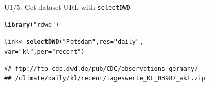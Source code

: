 \documentclass[compress, xcolor=dvipsnames]{beamer}\usepackage[]{graphicx}\usepackage[]{color}
\makeatletter
\newcommand{\hlstr}[1]{\textcolor[rgb]{0.192,0.494,0.8}{#1}}%
\newcommand{\hlstd}[1]{\textcolor[rgb]{0.345,0.345,0.345}{#1}}%
\newcommand{\hlkwb}[1]{\textcolor[rgb]{0.69,0.353,0.396}{#1}}%
\newcommand{\hlkwc}[1]{\textcolor[rgb]{0.333,0.667,0.333}{#1}}%
\newcommand{\hlkwd}[1]{\textcolor[rgb]{0.737,0.353,0.396}{\textbf{#1}}}%
\newenvironment{kframe}{%
 \def\at@end@of@kframe{}%
 \ifinner\ifhmode%
  \def\at@end@of@kframe{\end{minipage}}%
  \begin{minipage}{\columnwidth}%
 \fi\fi%
 \def\FrameCommand##1{\hskip\@totalleftmargin \hskip-\fboxsep
 \colorbox{shadecolor}{##1}\hskip-\fboxsep
     \hskip-\linewidth \hskip-\@totalleftmargin \hskip\columnwidth}%
 \MakeFramed {\advance\hsize-\width
   \@totalleftmargin\z@ \linewidth\hsize
   \@setminipage}}%
 {\par\unskip\endMakeFramed%
 \at@end@of@kframe}
\newenvironment{knitrout}{}{} %
\makeatother
\begin{document}
\begin{frame}[fragile]{U1/5: Get dataset URL with \texttt{selectDWD}}
\label{ul}
\pause
\begin{knitrout}
\color{fgcolor}\begin{kframe}
\begin{alltt}
\hlkwd{library}\hlstd{(}\hlstr{"rdwd"}\hlstd{)}
\end{alltt}
\end{kframe}
\end{knitrout}
\pause
\begin{knitrout}
\color{fgcolor}\begin{kframe}
\begin{alltt}
\hlstd{link} \hlkwb{<-} \hlkwd{selectDWD}\hlstd{(}\hlstr{"Potsdam"}\hlstd{,} \hlkwc{res}\hlstd{=}\hlstr{"daily"}\hlstd{,}
                  \hlkwc{var}\hlstd{=}\hlstr{"kl"}\hlstd{,} \hlkwc{per}\hlstd{=}\hlstr{"recent"}\hlstd{)}
\end{alltt}
\end{kframe}
\end{knitrout}
\pause
\begin{knitrout}
\color{fgcolor}\begin{kframe}
\begin{verbatim}
## ftp://ftp-cdc.dwd.de/pub/CDC/observations_germany/
## /climate/daily/kl/recent/tageswerte_KL_03987_akt.zip
\end{verbatim}
\end{kframe}
\end{knitrout}
\end{frame}

\end{document}
